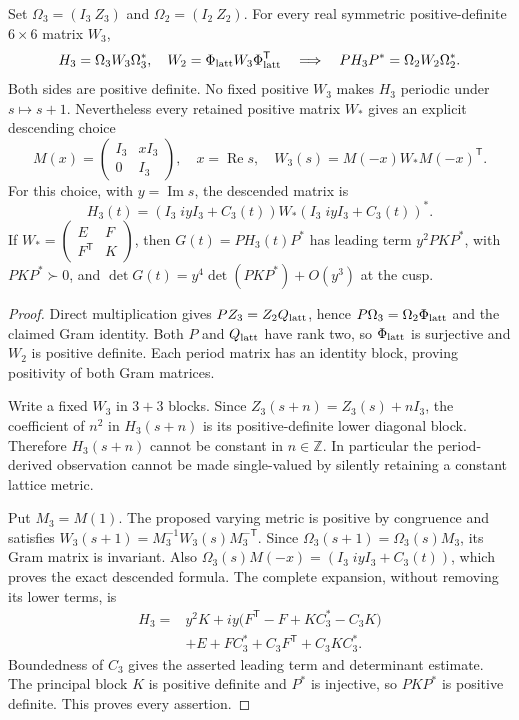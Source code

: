\begin{proposition}\label{q444:period-gram}
Set $\Omega_3=(I_3\ Z_3)$ and $\Omega_2=(I_2\ Z_2)$.
For every real symmetric positive-definite $6\times6$ matrix $W_3$,
\[
 H_3=\Omega_3W_3\Omega_3^*,\quad
 W_2=\Phi_{\rm latt}W_3\Phi_{\rm latt}^{\mathsf T}
 \quad\Longrightarrow\quad
 PH_3P^*=\Omega_2W_2\Omega_2^*.
\]
Both sides are positive definite. No fixed positive $W_3$ makes $H_3$
periodic under $s\mapsto s+1$. Nevertheless every retained positive
matrix $W_*$ gives an explicit descending choice
\[
 M(x)=\begin{pmatrix}I_3&xI_3\\0&I_3\end{pmatrix},\quad
 x=\operatorname{Re}s,\quad
 W_3(s)=M(-x)W_*M(-x)^{\mathsf T}.
\]
For this choice, with $y=\operatorname{Im}s$, the descended matrix is
\[
 H_3(t)=(I_3\;iyI_3+C_3(t))W_*(I_3\;iyI_3+C_3(t))^*.
\]
If $W_*=\left(\begin{smallmatrix}E&F\\F^{\mathsf T}&K\end{smallmatrix}\right)$,
then $G(t)=PH_3(t)P^*$ has leading term $y^2PKP^*$, with $PKP^*\succ0$,
and $\det G(t)=y^4\det(PKP^*)+O(y^3)$ at the cusp.
\end{proposition}
\begin{proof}
Direct multiplication gives $PZ_3=Z_2Q_{\rm latt}$, hence
$P\Omega_3=\Omega_2\Phi_{\rm latt}$ and the claimed Gram identity.
Both $P$ and $Q_{\rm latt}$ have rank two, so $\Phi_{\rm latt}$ is
surjective and $W_2$ is positive definite. Each period matrix has an
identity block, proving positivity of both Gram matrices.

Write a fixed $W_3$ in $3+3$ blocks. Since $Z_3(s+n)=Z_3(s)+nI_3$,
the coefficient of $n^2$ in $H_3(s+n)$ is its positive-definite lower
diagonal block. Therefore $H_3(s+n)$ cannot be constant in $n\in\mathbb Z$.
In particular the period-derived observation cannot be made single-valued
by silently retaining a constant lattice metric.

Put $M_3=M(1)$. The proposed varying metric is positive by congruence
and satisfies $W_3(s+1)=M_3^{-1}W_3(s)M_3^{-\mathsf T}$.
Since $\Omega_3(s+1)=\Omega_3(s)M_3$, its Gram matrix is invariant.
Also $\Omega_3(s)M(-x)=(I_3\;iyI_3+C_3(t))$, which proves the exact
descended formula. The complete expansion, without removing its lower
terms, is
\begin{align*}
 H_3={}&y^2K+iy\bigl(F^{\mathsf T}-F+KC_3^*-C_3K\bigr)\\
       &+E+FC_3^*+C_3F^{\mathsf T}+C_3KC_3^*.
\end{align*}
Boundedness of $C_3$ gives the asserted leading term and determinant
estimate. The principal block $K$ is positive definite and $P^*$ is
injective, so $PKP^*$ is positive definite. This proves every assertion.
\end{proof}

